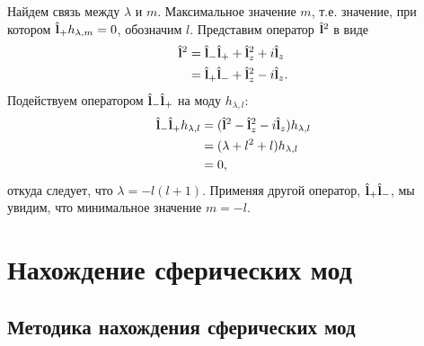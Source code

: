 \documentclass[12pt,a4paper]{article}
\begin{document}
            Найдем связь между $\lambda$ и $m$. Максимальное значение $m$, т.е. значение, при котором $\hat{\mathbf{l}}_{+} h_{\lambda,m} = 0$, обозначим $l$. Представим оператор $\hat{\mathbf{l}}^2$ в виде
            \begin{equation}\begin{aligned}
                \hat{\mathbf{l}}^2
                    &= \hat{\mathbf{l}}_{-}\hat{\mathbf{l}}_{+} + \hat{\mathbf{l}}^2_{z} + i \hat{\mathbf{l}}_{z} \\
                    &= \hat{\mathbf{l}}_{+}\hat{\mathbf{l}}_{-} + \hat{\mathbf{l}}^2_{z} - i \hat{\mathbf{l}}_{z} .
            \end{aligned}\end{equation}
            Подействуем оператором $\hat{\mathbf{l}}_{-}\hat{\mathbf{l}}_{+}$ на моду $h_{\lambda,l}$:
            \begin{equation}\begin{aligned}
                \hat{\mathbf{l}}_{-}\hat{\mathbf{l}}_{+} h_{\lambda,l}
                    &= (\hat{\mathbf{l}}^2 - \hat{\mathbf{l}}^2_{z} - i \hat{\mathbf{l}}_{z}) h_{\lambda,l} \\
                    &= (\lambda + l^2 + l) h_{\lambda,l} \\
                    &= 0 ,
            \end{aligned}\end{equation}
            откуда следует, что $\lambda = - l (l + 1)$. Применяя другой оператор, $\hat{\mathbf{l}}_{+}\hat{\mathbf{l}}_{-}$, мы увидим, что минимальное значение $m = - l$.


    \section{Нахождение сферических мод}


        \subsection{Методика нахождения сферических мод}
\end{document}
